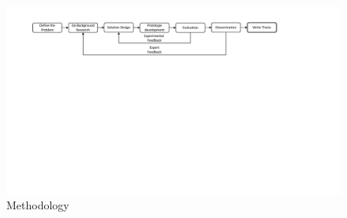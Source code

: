 \begin{figure}[!htp]
  \center
  \includegraphics[width=1\textwidth]{figures/scientific_methodology}
  \caption{Methodology}
  \label{fig:methodology}
\end{figure}